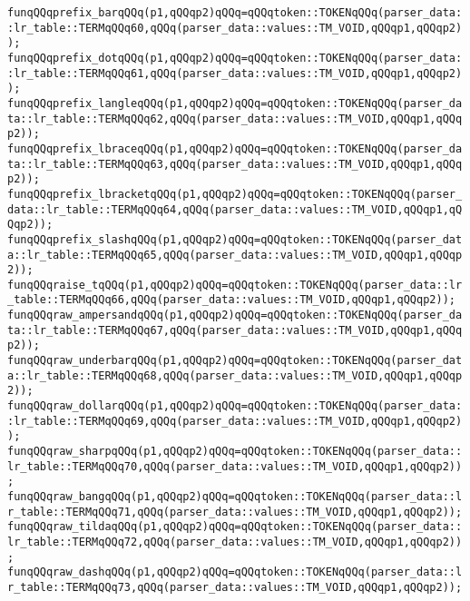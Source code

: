 \verb|funqQQqprefix_barqQQq(p1,qQQqp2)qQQq=qQQqtoken::TOKENqQQq(parser_data::lr_table::TERMqQQq60,qQQq(parser_data::values::TM_VOID,qQQqp1,qQQqp2));|\newline
\verb|funqQQqprefix_dotqQQq(p1,qQQqp2)qQQq=qQQqtoken::TOKENqQQq(parser_data::lr_table::TERMqQQq61,qQQq(parser_data::values::TM_VOID,qQQqp1,qQQqp2));|\newline
\verb|funqQQqprefix_langleqQQq(p1,qQQqp2)qQQq=qQQqtoken::TOKENqQQq(parser_data::lr_table::TERMqQQq62,qQQq(parser_data::values::TM_VOID,qQQqp1,qQQqp2));|\newline
\verb|funqQQqprefix_lbraceqQQq(p1,qQQqp2)qQQq=qQQqtoken::TOKENqQQq(parser_data::lr_table::TERMqQQq63,qQQq(parser_data::values::TM_VOID,qQQqp1,qQQqp2));|\newline
\verb|funqQQqprefix_lbracketqQQq(p1,qQQqp2)qQQq=qQQqtoken::TOKENqQQq(parser_data::lr_table::TERMqQQq64,qQQq(parser_data::values::TM_VOID,qQQqp1,qQQqp2));|\newline
\verb|funqQQqprefix_slashqQQq(p1,qQQqp2)qQQq=qQQqtoken::TOKENqQQq(parser_data::lr_table::TERMqQQq65,qQQq(parser_data::values::TM_VOID,qQQqp1,qQQqp2));|\newline
\verb|funqQQqraise_tqQQq(p1,qQQqp2)qQQq=qQQqtoken::TOKENqQQq(parser_data::lr_table::TERMqQQq66,qQQq(parser_data::values::TM_VOID,qQQqp1,qQQqp2));|\newline
\verb|funqQQqraw_ampersandqQQq(p1,qQQqp2)qQQq=qQQqtoken::TOKENqQQq(parser_data::lr_table::TERMqQQq67,qQQq(parser_data::values::TM_VOID,qQQqp1,qQQqp2));|\newline
\verb|funqQQqraw_underbarqQQq(p1,qQQqp2)qQQq=qQQqtoken::TOKENqQQq(parser_data::lr_table::TERMqQQq68,qQQq(parser_data::values::TM_VOID,qQQqp1,qQQqp2));|\newline
\verb|funqQQqraw_dollarqQQq(p1,qQQqp2)qQQq=qQQqtoken::TOKENqQQq(parser_data::lr_table::TERMqQQq69,qQQq(parser_data::values::TM_VOID,qQQqp1,qQQqp2));|\newline
\verb|funqQQqraw_sharpqQQq(p1,qQQqp2)qQQq=qQQqtoken::TOKENqQQq(parser_data::lr_table::TERMqQQq70,qQQq(parser_data::values::TM_VOID,qQQqp1,qQQqp2));|\newline
\verb|funqQQqraw_bangqQQq(p1,qQQqp2)qQQq=qQQqtoken::TOKENqQQq(parser_data::lr_table::TERMqQQq71,qQQq(parser_data::values::TM_VOID,qQQqp1,qQQqp2));|\newline
\verb|funqQQqraw_tildaqQQq(p1,qQQqp2)qQQq=qQQqtoken::TOKENqQQq(parser_data::lr_table::TERMqQQq72,qQQq(parser_data::values::TM_VOID,qQQqp1,qQQqp2));|\newline
\verb|funqQQqraw_dashqQQq(p1,qQQqp2)qQQq=qQQqtoken::TOKENqQQq(parser_data::lr_table::TERMqQQq73,qQQq(parser_data::values::TM_VOID,qQQqp1,qQQqp2));|\newline
